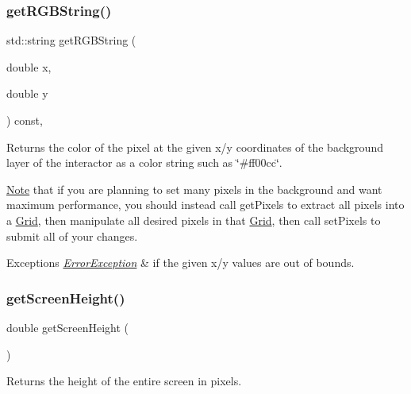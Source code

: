 \subsubsection{\texorpdfstring{get\+R\+G\+B\+String()}{getRGBString()}}
{\footnotesize\ttfamily std\+::string get\+R\+G\+B\+String (\begin{DoxyParamCaption}\item[{double}]{x,  }\item[{double}]{y }\end{DoxyParamCaption}) const\hspace{0.3cm}{\ttfamily [virtual]}, {\ttfamily [inherited]}}



Returns the color of the pixel at the given x/y coordinates of the background layer of the interactor as a color string such as \char`\"{}\#ff00cc\char`\"{}. 

\mbox{\hyperlink{classNote}{Note}} that if you are planning to set many pixels in the background and want maximum performance, you should instead call get\+Pixels to extract all pixels into a \mbox{\hyperlink{classGrid}{Grid}}, then manipulate all desired pixels in that \mbox{\hyperlink{classGrid}{Grid}}, then call set\+Pixels to submit all of your changes.


\begin{DoxyExceptions}{Exceptions}
{\em \mbox{\hyperlink{classErrorException}{Error\+Exception}}} & if the given x/y values are out of bounds. \\
\hline
\end{DoxyExceptions}
\mbox{\label{classGWindow_a9942379fdf4fb4445c35eaf3390b7ccb}} 
\subsubsection{\texorpdfstring{get\+Screen\+Height()}{getScreenHeight()}}
{\footnotesize\ttfamily double get\+Screen\+Height (\begin{DoxyParamCaption}{ }\end{DoxyParamCaption})\hspace{0.3cm}{\ttfamily [static]}}



Returns the height of the entire screen in pixels. 

\mbox{\label{classGWindow_ae3d08d5cde8163274459797770596809}} 
